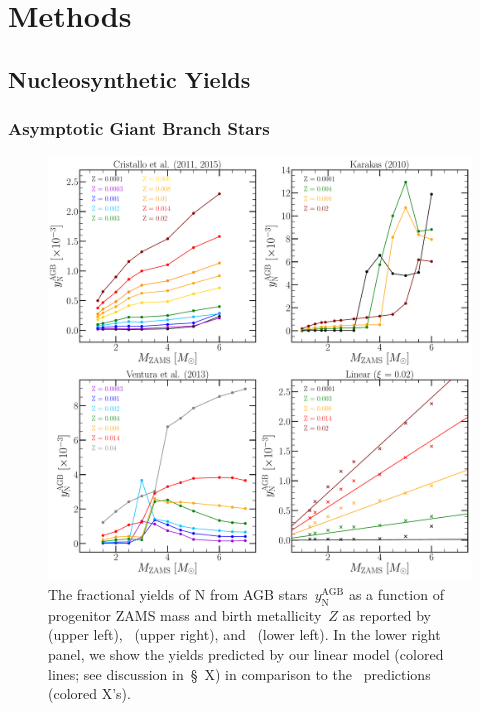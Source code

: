 \documentclass[ms.tex]{subfiles}
\begin{document}
 

\section{Methods} 

\subsection{Nucleosynthetic Yields} 
\subsubsection{Asymptotic Giant Branch Stars} 

\begin{figure} 
\centering 
\includegraphics[scale = 0.4]{agb_yield_models.pdf} 
\caption{
The fractional yields of N from AGB stars~$y_\text{N}^\text{AGB}$ as a function 
of progenitor ZAMS mass and birth metallicity~$Z$ as reported 
by~\citet{Cristallo2011, Cristallo2015} (upper left),~\citet{Karakas2010} 
(upper right), and~\citet{Ventura2013} (lower left). In the lower right panel, 
we show the yields predicted by our linear model (colored lines; see discussion 
in~\S~X) in comparison to the~\citet{Cristallo2011, Cristallo2015} predictions 
(colored X's). 
}
\label{fig:agb_yield_models} 
\end{figure} 
\end{document}
